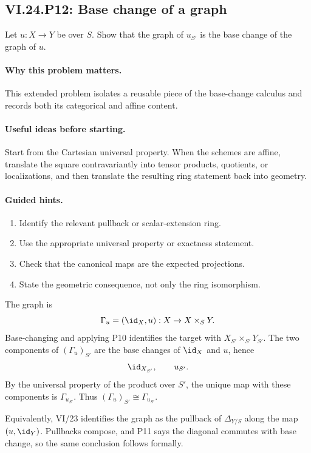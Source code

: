 \subsection*{VI.24.P12: Base change of a graph}
\begin{problem}\label{prob:vi24-p12}
Let $u:X\to Y$ be over $S$. Show that the graph of $u_{S'}$ is the base change of the graph of $u$.
\end{problem}

\ifdefined\FullProblemDossiers
\paragraph{Why this problem matters.}
This extended problem isolates a reusable piece of the base-change calculus and records both its categorical and affine content.

\paragraph{Useful ideas before starting.}
Start from the Cartesian universal property.  When the schemes are affine, translate the square contravariantly into tensor products, quotients, or localizations, and then translate the resulting ring statement back into geometry.

\paragraph{Guided hints.}
\begin{enumerate}
\item Identify the relevant pullback or scalar-extension ring.
\item Use the appropriate universal property or exactness statement.
\item Check that the canonical maps are the expected projections.
\item State the geometric consequence, not only the ring isomorphism.
\end{enumerate}

\begin{solution}
The graph is
\[
\Gamma_u=(\id_X,u):X\to X\times_SY.
\]
Base-changing and applying P10 identifies the target with $X_{S'}\times_{S'}Y_{S'}$.  The two components of $(\Gamma_u)_{S'}$ are the base changes of $\id_X$ and $u$, hence
\[
\id_{X_{S'}},\qquad u_{S'}.
\]
By the universal property of the product over $S'$, the unique map with these components is
$\Gamma_{u_{S'}}$.  Thus $(\Gamma_u)_{S'}\cong\Gamma_{u_{S'}}$.

Equivalently, VI/23 identifies the graph as the pullback of $\Delta_{Y/S}$ along the map
$(u,\id_Y)$.  Pullbacks compose, and P11 says the diagonal commutes with base change, so the same conclusion follows formally.
\end{solution}

